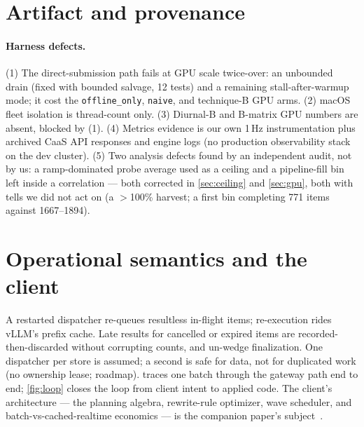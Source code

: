 \documentclass[conference]{IEEEtran}
\newcommand{\code}[1]{\texttt{#1}}
\begin{document}
\appendices

\section{Artifact and provenance}
\label{app:provenance}

\paragraph{Harness defects.} (1) The direct-submission path fails at GPU scale
twice-over: an unbounded drain (fixed with bounded salvage, 12 tests) and a remaining
stall-after-warmup mode; it cost the \code{offline\_only}, \code{naive}, and technique-B
GPU arms. (2) macOS fleet isolation is thread-count only. (3) Diurnal-B and B-matrix GPU
numbers are absent, blocked by (1). (4) Metrics evidence is our own 1\,Hz
instrumentation plus archived CaaS API responses and engine logs (no production
observability stack on the dev cluster). (5) Two analysis defects found by an
independent audit, not by us: a ramp-dominated probe average used as a ceiling and a
pipeline-fill bin left inside a correlation --- both corrected in \cref{sec:ceiling} and
\cref{sec:gpu}, both with tells we did not act on (a $>$100\% harvest; a first bin
completing 771 items against 1667--1894).

\section{Operational semantics and the client}
\label{app:ops}

A restarted dispatcher re-queues resultless in-flight items; re-execution rides vLLM's
prefix cache. Late results for cancelled or expired items are recorded-then-discarded
without corrupting counts, and un-wedge finalization. One dispatcher per store is
assumed; a second is safe for data, not for duplicated work (no ownership lease;
roadmap).  traces one batch through the gateway path end to end;
\cref{fig:loop} closes the loop from client intent to applied code. The client's
architecture --- the planning algebra, rewrite-rule optimizer, wave scheduler, and
batch-vs-cached-realtime economics --- is the companion paper's
subject~\citep{lazycode-paper}.



\end{document}
